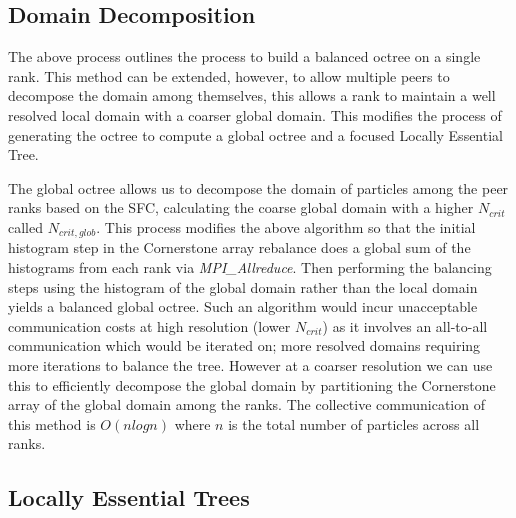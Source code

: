 \subsection{Domain Decomposition}

The above process outlines the process to build a balanced octree on a single rank. This method can be extended, however, to allow multiple peers to decompose the domain among themselves, this allows a rank to maintain a well resolved local domain with a coarser global domain. This modifies the process of generating the octree to compute a global octree and a focused Locally Essential Tree. 

The global octree allows us to decompose the domain of particles among the peer ranks based on the SFC, calculating the coarse global domain with a higher $N_{crit}$ called $N_{crit,glob}$. This process modifies the above algorithm so that the initial histogram step in the Cornerstone array rebalance does a global sum of the histograms from each rank via \textit{MPI\_Allreduce}. Then performing the balancing steps using the histogram of the global domain rather than the local domain yields a balanced global octree. Such an algorithm would incur unacceptable communication costs at high resolution (lower $N_{crit}$) as it involves an all-to-all communication which would be iterated on; more resolved domains requiring more iterations to balance the tree. However at a coarser resolution we can use this to efficiently decompose the global domain by partitioning the Cornerstone array of the global domain among the ranks. The collective communication of this method is $O(nlogn)$ where $n$ is the total number of particles across all ranks.

\subsection{Locally Essential Trees}


